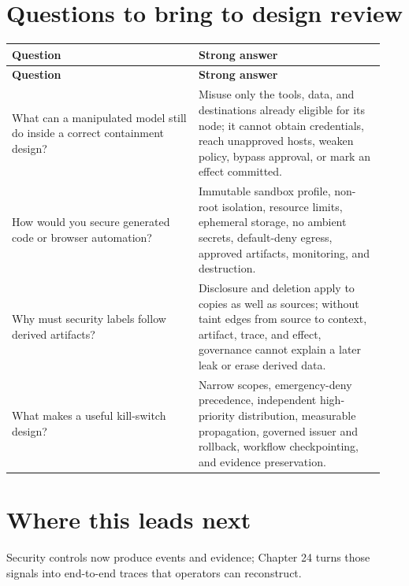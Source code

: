 \section{Questions to bring to design review}

\BookTableStart
\small
\begin{longtable}{@{}Y{0.4700\linewidth}Y{0.4700\linewidth}@{}}
\color{white}\bfseries \textbf{Question} & \color{white}\bfseries \textbf{Strong answer} \\
\endfirsthead
{}
\color{white}\bfseries \textbf{Question} & \color{white}\bfseries \textbf{Strong answer} \\
\endhead
What can a manipulated model still do inside a correct containment design? & Misuse only the tools, data, and destinations already eligible for its node; it cannot obtain credentials, reach unapproved hosts, weaken policy, bypass approval, or mark an effect committed. \\
How would you secure generated code or browser automation? & Immutable sandbox profile, non-root isolation, resource limits, ephemeral storage, no ambient secrets, default-deny egress, approved artifacts, monitoring, and destruction. \\
Why must security labels follow derived artifacts? & Disclosure and deletion apply to copies as well as sources; without taint edges from source to context, artifact, trace, and effect, governance cannot explain a later leak or erase derived data. \\
What makes a useful kill-switch design? & Narrow scopes, emergency-deny precedence, independent high-priority distribution, measurable propagation, governed issuer and rollback, workflow checkpointing, and evidence preservation. \\
\end{longtable}
\BookTableEnd

\section{Where this leads next}

Security controls now produce events and evidence; Chapter 24 turns those signals into end-to-end traces that operators can reconstruct.\par


